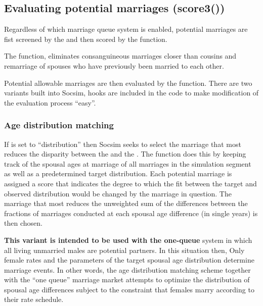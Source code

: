 \subsection{Evaluating potential marriages (score3())}
\label{sec:score3}

Regardless of which marriage queue system is enabled, potential
marriages are fist screened by the  and
then scored by the  function. 


The function, eliminates consanguineous
marriages closer than cousins and remarriage of spouses who have
previously been married to each other. 

Potential allowable marriages are then evaluated by the
 function.  There are two variants built into Socsim,
hooks are included in the code to make modification of the evaluation
process ``easy''.

\subsubsection{Age distribution matching}
\label{sec:agedist}

If  is set to ``distribution'' then Socsim seeks
to select the marriage that most reduces the disparity between the
 and the
.  The
 function does this by keeping track of the spousal
ages at marriage of all marriages in the simulation segment as well as
a predetermined target distribution. Each potential marriage is
assigned a score that indicates the degree to which the fit between
the target and observed distribution would be changed by the marriage
in question.  The marriage that most reduces the unweighted sum of the
differences between the fractions of marriages conducted at each
spousal age difference (in single years) is then chosen.

\textbf{This variant is intended to be used with the one-queue} system
in which all living unmarried males are potential partners.  In this
situation then, Only female rates and the parameters of the target
spousal age distribution determine marriage events.  In other words,
the age distribution matching scheme together with the ``one queue''
marriage market attempts to optimize the distribution of spousal age differences
subject to the constraint that females marry according to their rate
schedule.

